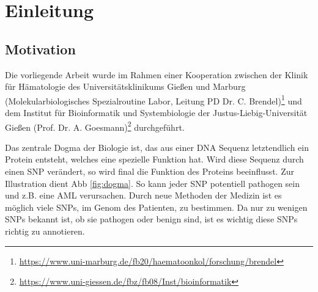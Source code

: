\chapter{Einleitung}
\label{cha:Einleitung}

\section{Motivation}


Die vorliegende Arbeit wurde im Rahmen einer Kooperation zwischen der Klinik für Hämatologie des Universitätsklinikums Gießen und Marburg (Molekularbiologisches Spezialroutine Labor, Leitung PD Dr. C. Brendel)\footnote{\url{https://www.uni-marburg.de/fb20/haematoonkol/forschung/brendel}} und dem Institut für Bioinformatik und Systembiologie der Justus-Lie\-big-Uni\-ver\-si\-tät Gießen (Prof. Dr. A. Goesmann)\footnote{\url{https://www.uni-giessen.de/fbz/fb08/Inst/bioinformatik}} durchgeführt. 


Das zentrale Dogma der Biologie ist, das aus einer \ac{DNA} Sequenz letztendlich ein Protein entsteht, welches eine spezielle Funktion hat. Wird diese Sequenz durch einen \ac{SNP} verändert, so wird final die Funktion des Proteins beeinflusst. Zur Illustration dient \ac{Abb} \ref{fig:dogma}. So kann jeder \ac{SNP} potentiell pathogen sein und z.B. eine \ac{AML} verursachen. Durch neue Methoden der Medizin ist es möglich viele \ac{SNP}s, im Genom des Patienten, zu bestimmen. Da nur zu wenigen \ac{SNP}s bekannt ist, ob sie pathogen oder benign sind, ist es wichtig diese \ac{SNP}s richtig zu annotieren.
 
